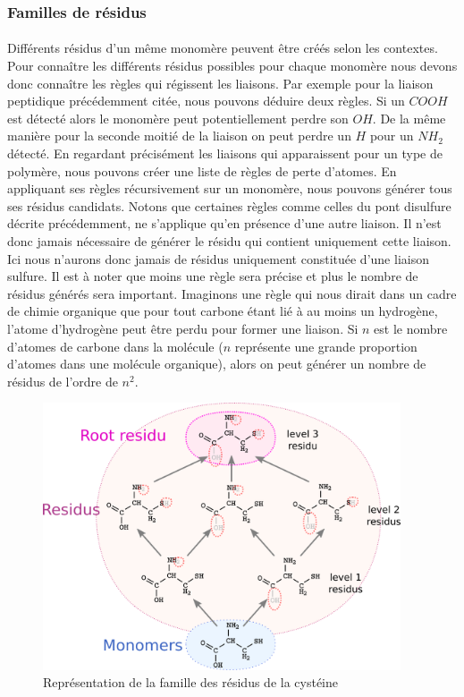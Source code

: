 \documentclass[12pt,french,twoside]{report}
\begin{document}
\subsubsection{Familles de résidus}

\paragraph{}Différents résidus d'un même monomère peuvent être créés selon les contextes. Pour connaître les différents résidus
possibles pour chaque monomère nous devons donc connaître les règles qui régissent les liaisons. Par exemple pour la liaison
peptidique précédemment citée, nous pouvons déduire deux règles. Si un $COOH$ est détecté alors le monomère peut potentiellement
perdre son $OH$. De la même manière pour la seconde moitié de la liaison on peut perdre un $H$ pour un $NH_2$ détecté. En
regardant précisément les liaisons qui apparaissent pour un type de polymère, nous pouvons créer une liste de règles de perte
d'atomes. En appliquant ses règles récursivement sur un monomère, nous pouvons générer tous ses résidus candidats. Notons que
certaines règles comme celles du pont disulfure décrite précédemment, ne s'applique qu'en présence d'une autre liaison. Il n'est
donc jamais nécessaire de générer le résidu qui contient uniquement cette liaison. Ici nous n'aurons donc jamais de résidus
uniquement constituée d'une liaison sulfure. Il est
à noter que moins une règle sera précise et plus le nombre de résidus générés sera important. Imaginons une règle qui nous dirait
dans un cadre de chimie organique que pour tout carbone étant lié à au moins un hydrogène, l'atome d'hydrogène peut être perdu
pour former une liaison. Si $n$ est le nombre d'atomes de carbone dans la molécule ($n$ représente une grande proportion d'atomes
dans une molécule organique), alors on peut générer un nombre de résidus de l'ordre de $n^2$.

\begin{figure}
  \begin{center}
    \includegraphics[width=400px]{Figures/s2m/residues/cystein_family.png}
    \caption{\label{sulfure}Représentation de la famille des résidus de la cystéine}
  \end{center}
\end{figure}
\end{document}
